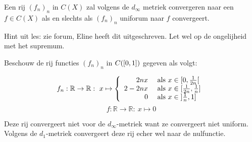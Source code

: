 \documentclass[main.tex]{subfiles}
\begin{document}
\begin{st}
  Een rij $(f_{n})_{n}$ in $C(X)$ zal volgens de $d_{\infty}$ metriek convergeren naar een $f\in C(X)$ als en slechts als $(f_{n})_{n}$ uniforum naar $f$ convergeert.

Hint uit les: zie forum, Eline heeft dit uitgeschreven.
Let wel op de ongelijheid met het supremum.
\end{st}

\begin{vb}
  Beschouw de rij functies $(f_{n})_{n}$ in $C(\interval{0}{1})$ gegeven als volgt:

  \noindent
  \begin{minipage}{.45\textwidth}
    \begin{figure}[H]
      \centering
    \end{figure}
  \end{minipage}
  \begin{minipage}{.45\textwidth}
  \[
  f_{n}: \mathbb{R} \rightarrow \mathbb{R}:\ x \mapsto
  \left\{
    \begin{array}{rl}
      2nx   & \text{ als } x \in \interval[open right]{0}{\frac{1}{2n}}\\
      2-2nx & \text{ als } x \in \interval{\frac{1}{2n}}{\frac{1}{n}}\\
      0     & \text{ als } x \in \interval[open left ]{\frac{1}{n}}{1}\\
    \end{array}
  \right.
  \]
  \[ f: \mathbb{R} \rightarrow \mathbb{R}:\ x \mapsto 0 \]
  \end{minipage}
  
  Deze rij convergeert niet voor de $d_{\infty}$-metriek want ze convergeert niet uniform.
  Volgens de $d_{1}$-metriek convergeert deze rij echer wel naar de nulfunctie.
\end{vb}
\end{document}
